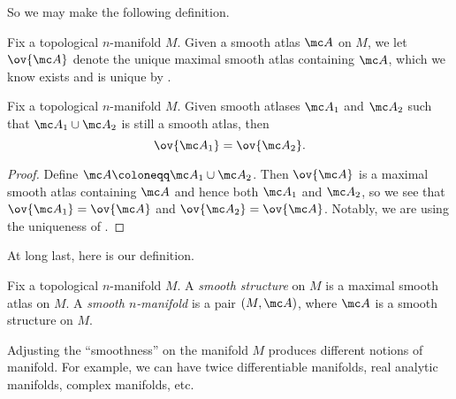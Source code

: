 \documentclass[../notes.tex]{subfiles}
\begin{document}
So we may make the following definition.
\begin{definition}
	Fix a topological $n$-manifold $M$. Given a smooth atlas $\mc A$ on $M$, we let $\ov{\mc A}$ denote the unique maximal smooth atlas containing $\mc A$, which we know exists and is unique by .
\end{definition}
\begin{corollary}
	Fix a topological $n$-manifold $M$. Given smooth atlases $\mc A_1$ and $\mc A_2$ such that $\mc A_1\cup\mc A_2$ is still a smooth atlas, then
	\[\ov{\mc A_1}=\ov{\mc A_2}.\]
\end{corollary}
\begin{proof}
	Define $\mc A\coloneqq\mc A_1\cup\mc A_2$. Then $\ov{\mc A}$ is a maximal smooth atlas containing $\mc A$ and hence both $\mc A_1$ and $\mc A_2$, so we see that $\ov{\mc A_1}=\ov{\mc A}$ and $\ov{\mc A_2}=\ov{\mc A}$. Notably, we are using the uniqueness of .
\end{proof}
At long last, here is our definition.
\begin{definition}
	Fix a topological $n$-manifold $M$. A \textit{smooth structure} on $M$ is a maximal smooth atlas on $M$. A \textit{smooth $n$-manifold} is a pair $(M,\mc A)$, where $\mc A$ is a smooth structure on $M$.
\end{definition}
\begin{remark}
	Adjusting the ``smoothness'' on the manifold $M$ produces different notions of manifold. For example, we can have twice differentiable manifolds, real analytic manifolds, complex manifolds, etc.
\end{remark}
\end{document}
